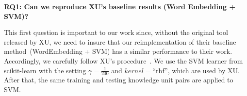 \documentclass[sigconf]{acmart}
\theoremstyle{break}
\begin{document}
\begin{table}[!htp]
\centering
\caption{Comparison of Our Baseline Method with XU's. The Best Scores are Marked in \textbf{Bold}.}
\label{tab:baseline}
\end{table}


\textbf{RQ1: Can we reproduce XU's baseline results (Word Embedding + SVM)?}
 
 


This first question   is    important to our work since, without the original tool released by XU,
we need to insure that  our reimplementation of their baseline method~(WordEmbedding + SVM) has a similar performance to their work.
Accordingly, we carefully follow XU's procedure~\cite{xu2016predicting}. We 
use the SVM learner from scikit-learn with the setting $\gamma = \frac{1}{200}$ and $\mathit{kernel=}$``rbf'', which are used by XU. After that, the same training and testing knowledge unit pairs are applied to SVM.
\end{document}
